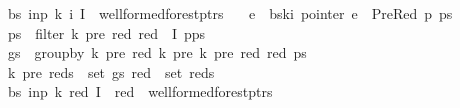 \begin{isabellebody}
\ \ \ {\isachardoublequoteopen}{\isacharparenleft}{\kern0pt}bs{\isacharcomma}{\kern0pt}\ inp{\isacharcomma}{\kern0pt}\ k{\isacharcomma}{\kern0pt}\ i{\isacharcomma}{\kern0pt}\ I{\isacharparenright}{\kern0pt}\ {\isasymin}\ wellformed{\isacharunderscore}{\kern0pt}forest{\isacharunderscore}{\kern0pt}ptrs{\isachardoublequoteclose}\isanewline
\ \ \ {\isachardoublequoteopen}e\ {\isacharequal}{\kern0pt}\ bs{\isacharbang}{\kern0pt}k{\isacharbang}{\kern0pt}i{\isachardoublequoteclose}\ {\isachardoublequoteopen}pointer\ e\ {\isacharequal}{\kern0pt}\ PreRed\ p\ ps{\isachardoublequoteclose}\isanewline
\ \ \ {\isachardoublequoteopen}ps{\isacharprime}{\kern0pt}\ {\isacharequal}{\kern0pt}\ filter\ {\isacharparenleft}{\kern0pt}{\isasymlambda}{\isacharparenleft}{\kern0pt}k{\isacharprime}{\kern0pt}{\isacharcomma}{\kern0pt}\ pre{\isacharcomma}{\kern0pt}\ red{\isacharparenright}{\kern0pt}{\isachardot}{\kern0pt}\ red\ {\isasymnotin}\ I{\isacharparenright}{\kern0pt}\ {\isacharparenleft}{\kern0pt}p{\isacharhash}{\kern0pt}ps{\isacharparenright}{\kern0pt}{\isachardoublequoteclose}\isanewline
\ \ \ {\isachardoublequoteopen}gs\ {\isacharequal}{\kern0pt}\ group{\isacharunderscore}{\kern0pt}by\ {\isacharparenleft}{\kern0pt}{\isasymlambda}{\isacharparenleft}{\kern0pt}k{\isacharprime}{\kern0pt}{\isacharcomma}{\kern0pt}\ pre{\isacharcomma}{\kern0pt}\ red{\isacharparenright}{\kern0pt}{\isachardot}{\kern0pt}\ {\isacharparenleft}{\kern0pt}k{\isacharprime}{\kern0pt}{\isacharcomma}{\kern0pt}\ pre{\isacharparenright}{\kern0pt}{\isacharparenright}{\kern0pt}\ {\isacharparenleft}{\kern0pt}{\isasymlambda}{\isacharparenleft}{\kern0pt}k{\isacharprime}{\kern0pt}{\isacharcomma}{\kern0pt}\ pre{\isacharcomma}{\kern0pt}\ red{\isacharparenright}{\kern0pt}{\isachardot}{\kern0pt}\ red{\isacharparenright}{\kern0pt}\ ps{\isacharprime}{\kern0pt}{\isachardoublequoteclose}\isanewline
\ \ \ {\isachardoublequoteopen}{\isacharparenleft}{\kern0pt}{\isacharparenleft}{\kern0pt}k{\isacharprime}{\kern0pt}{\isacharcomma}{\kern0pt}\ pre{\isacharparenright}{\kern0pt}{\isacharcomma}{\kern0pt}\ reds{\isacharparenright}{\kern0pt}\ {\isasymin}\ set\ gs{\isachardoublequoteclose}\ {\isachardoublequoteopen}red\ {\isasymin}\ set\ reds{\isachardoublequoteclose}\isanewline
\ \ \ {\isachardoublequoteopen}{\isacharparenleft}{\kern0pt}bs{\isacharcomma}{\kern0pt}\ inp{\isacharcomma}{\kern0pt}\ k{\isacharcomma}{\kern0pt}\ red{\isacharcomma}{\kern0pt}\ I\ {\isasymunion}\ {\isacharbraceleft}{\kern0pt}red{\isacharbraceright}{\kern0pt}{\isacharparenright}{\kern0pt}\ {\isasymin}\ wellformed{\isacharunderscore}{\kern0pt}forest{\isacharunderscore}{\kern0pt}ptrs{\isachardoublequoteclose}%

\end{isabellebody}
